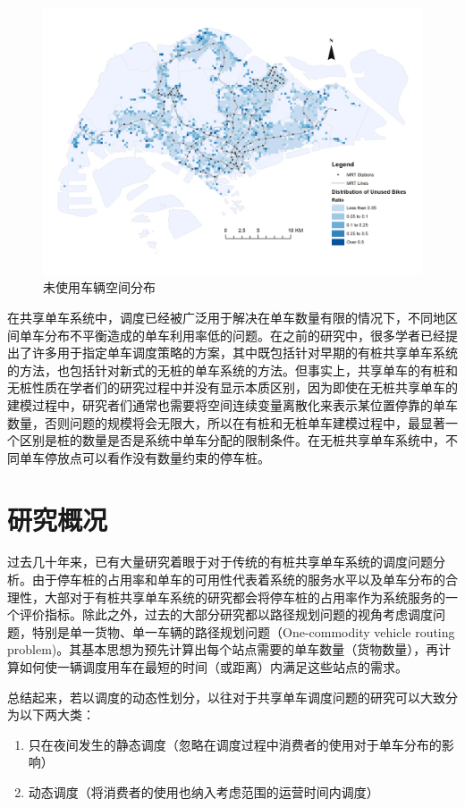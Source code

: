\documentclass[]{tongjithesis}
\numberwithin{equation}{chapter}
\begin{document}
\begin{figure}[H]
	\centering
	\includegraphics[width= 0.9 \textwidth]{figures_main/unused_spatial_distribution_ratio.png}
	\caption{未使用车辆空间分布}
	\label{spatial_unused}
\end{figure}

在共享单车系统中，调度已经被广泛用于解决在单车数量有限的情况下，不同地区间单车分布不平衡造成的单车利用率低的问题。在之前的研究中，很多学者已经提出了许多用于指定单车调度策略的方案，其中既包括针对早期的有桩共享单车系统的方法，也包括针对新式的无桩的单车系统的方法。但事实上，共享单车的有桩和无桩性质在学者们的研究过程中并没有显示本质区别，因为即使在无桩共享单车的建模过程中，研究者们通常也需要将空间连续变量离散化来表示某位置停靠的单车数量，否则问题的规模将会无限大，所以在有桩和无桩单车建模过程中，最显著一个区别是桩的数量是否是系统中单车分配的限制条件。在无桩共享单车系统中，不同单车停放点可以看作没有数量约束的停车桩。

\section{研究概况}
过去几十年来，已有大量研究着眼于对于传统的有桩共享单车系统的调度问题分析。由于停车桩的占用率和单车的可用性代表着系统的服务水平以及单车分布的合理性，大部对于有桩共享单车系统的研究都会将停车桩的占用率作为系统服务的一个评价指标。除此之外，过去的大部分研究都以路径规划问题的视角考虑调度问题，特别是单一货物、单一车辆的路径规划问题（One-commodity vehicle routing problem)。其基本思想为预先计算出每个站点需要的单车数量（货物数量），再计算如何使一辆调度用车在最短的时间（或距离）内满足这些站点的需求。

总结起来，若以调度的动态性划分，以往对于共享单车调度问题的研究可以大致分为以下两大类：\par
\begin{enumerate}
	\item 只在夜间发生的静态调度（忽略在调度过程中消费者的使用对于单车分布的影响）
	\item 动态调度（将消费者的使用也纳入考虑范围的运营时间内调度）
\end{enumerate}
\end{document}
